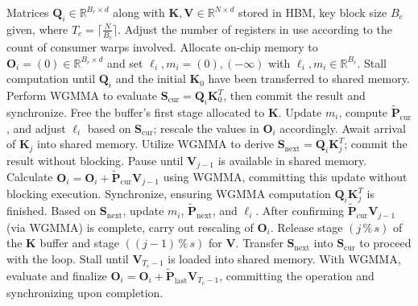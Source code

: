 \begin{enumerate}
\begin{algorithm}[H]
    \caption{\small\label{alg:flash3_wgmma}\textsc{FlashAttention-3} consumer warpgroup forward pass}
    \begin{algorithmic}[1]
      \REQUIRE  Matrices $\mathbf{Q}_i \in \mathbb{R}^{B_r \times d}$ along with $\mathbf{K}, \mathbf{V} \in \mathbb{R}^{N \times d}$ stored in HBM, key block size $B_c$ given, where $T_c = \lceil \frac{N}{B_c} \rceil$.
      \STATE Adjust the number of registers in use according to the count of consumer warps involved.
      \STATE Allocate on-chip memory to $\mathbf{O}_i = (0) \in \mathbb{R}^{B_r \times d}$ and set $\ell_i, m_i = (0), (-\infty)$ with $\ell_i, m_i \in \mathbb{R}^{B_r}$.
      \STATE Stall computation until $\mathbf{Q}_i$ and the initial $\mathbf{K}_0$ have been transferred to shared memory.
      \STATE Perform WGMMA to evaluate $\mathbf{S}_{\mathrm{cur}} = \mathbf{Q}_i \mathbf{K}_0^T$, then commit the result and synchronize.
      \STATE Free the buffer’s first stage allocated to $\mathbf{K}$.
      \STATE Update $m_{i}$, compute $\tilde{\mathbf{P}}_{\mathrm{cur}}$, and adjust $\ell_{i}$ based on $\mathbf{S}_{\mathrm{cur}}$; rescale the values in $\mathbf{O}_i$ accordingly.
        \STATE Await arrival of $\mathbf{K}_j$ into shared memory.
        \label{code:mainloop_start}
        \STATE Utilize WGMMA to derive $\mathbf{S}_{\mathrm{next}} = \mathbf{Q}_i \mathbf{K}_{j}^T$; commit the result without blocking. \label{code:first_wgmma}
        \STATE Pause until $\mathbf{V}_{j-1}$ is available in shared memory.
        \STATE Calculate $\mathbf{O}_{i} = \mathbf{O}_{i} + \tilde{\mathbf{P}}_{\mathrm{cur}} \mathbf{V}_{j-1}$ using WGMMA, committing this update without blocking execution. \label{code:second_wgmma}
        \STATE Synchronize, ensuring WGMMA computation $\mathbf{Q}_i \mathbf{K}_{j}^T$ is finished.
        \STATE Based on $\mathbf{S}_{\mathrm{next}}$, update $m_{i}$, $\tilde{\mathbf{P}}_{\mathrm{next}}$, and $\ell_{i}$. \label{code:softmax}
        \STATE After confirming $\tilde{\mathbf{P}}_{\mathrm{cur}} \mathbf{V}_{j-1}$ (via WGMMA) is complete, carry out rescaling of $\mathbf{O}_i$.
        \STATE Release stage $(j\,\%\,s)$ of the $\mathbf{K}$ buffer and stage $((j-1)\,\%\,s)$ for $\mathbf{V}$.
        \STATE Transfer $\mathbf{S}_{\mathrm{next}}$ into $\mathbf{S}_{\mathrm{cur}}$ to proceed with the loop.
        \label{code:mainloop_end}
      \ENDFOR \STATE Stall until $\mathbf{V}_{T_c - 1}$ is loaded into shared memory.
      \STATE With WGMMA, evaluate and finalize
      $\mathbf{O}_{i} = \mathbf{O}_{i} + \tilde{\mathbf{P}}_{\mathrm{last}} \mathbf{V}_{T_c - 1}$, committing the operation and synchronizing upon completion.


\end{algorithmic}
\end{algorithm}
\end{enumerate}
